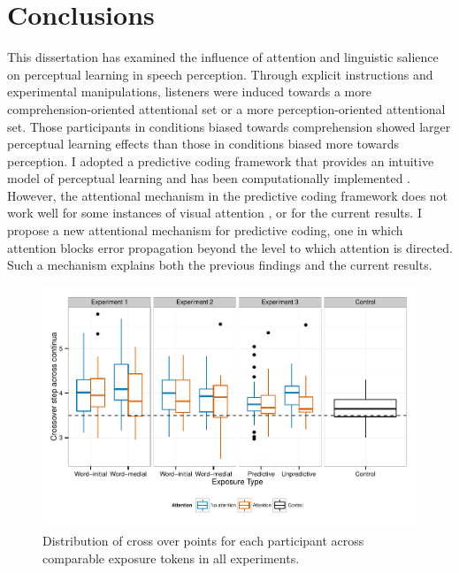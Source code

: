 
\chapter{Conclusions}
\label{chap:conclusion}

This dissertation has examined the influence of attention and linguistic salience on perceptual learning in speech perception.
Through explicit instructions and experimental manipulations, listeners were induced towards a more comprehension-oriented attentional set or a more perception-oriented attentional set.
Those participants in conditions biased towards comprehension showed larger perceptual learning effects than those in conditions biased more towards perception.
I adopted a predictive coding framework \citep{Clark2013} that provides an intuitive model of perceptual learning and has been computationally implemented \citep{Kleinschmidt2011}.
However, the attentional mechanism in the predictive coding framework does not work well for some instances of visual attention \citep{Block2013}, or for the current results.
I propose a new attentional mechanism for predictive coding, one in which attention blocks error propagation beyond the level to which attention is directed.  Such a mechanism explains both the previous findings and the current results.

\begin{figure}[!ht]
\caption{Distribution of cross over points for each participant across comparable exposure tokens in all experiments.}
\label{fig:exp123xoverdist}
\begin{center}
\includegraphics[width=\textwidth]{graphs/exp123_xoverdist}
\end{center}
\end{figure}


